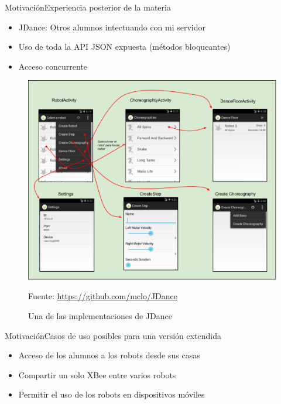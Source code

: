 \documentclass{beamer}
\begin{document}
\begin{frame}{Motivación}{Experiencia posterior de la materia}
    \begin{minipage}{0.7\linewidth}
        \begin{itemize}[<+->]
            \item JDance: Otros alumnos intectuando con mi servidor
            \item Uso de toda la API JSON expuesta (métodos bloqueantes)
            \item Acceso concurrente
        \end{itemize}
    \end{minipage}%
    \begin{minipage}{0.3\linewidth}
        \begin{figure}
            \includegraphics[width=\linewidth]{images/jdance}
            \caption{Una de las implementaciones de JDance}
        \vfill
        Fuente: \url{https://github.com/mclo/JDance}
        \end{figure}
    \end{minipage}
\end{frame}

\begin{frame}{Motivación}{Casos de uso posibles para una versión extendida}
    \begin{itemize}
        \item Acceso de los alumnos a los robots desde sus casas
        \item Compartir un solo XBee entre varios robots
        \item Permitir el uso de los robots en dispositivos móviles
    \end{itemize}
\end{frame}
\end{document}
